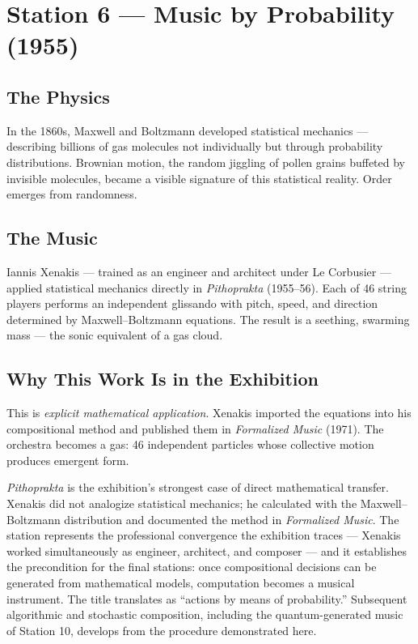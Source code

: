 \documentclass[11pt]{article}
\begin{document}
\section{Station 6 --- Music by Probability (1955)}

\subsection{The Physics}
In the 1860s, Maxwell and Boltzmann developed statistical mechanics --- describing billions
of gas molecules not individually but through probability distributions. Brownian motion, the
random jiggling of pollen grains buffeted by invisible molecules, became a visible signature
of this statistical reality. Order emerges from randomness.

\subsection{The Music}
Iannis Xenakis --- trained as an engineer and architect under Le Corbusier --- applied
statistical mechanics directly in \emph{Pithoprakta} (1955--56). Each of 46 string players
performs an independent glissando with pitch, speed, and direction determined by
Maxwell--Boltzmann equations. The result is a seething, swarming mass --- the sonic
equivalent of a gas cloud.

\subsection{Why This Work Is in the Exhibition}
This is \emph{explicit mathematical application}. Xenakis imported the equations into his
compositional method and published them in \emph{Formalized Music} (1971). The orchestra
becomes a gas: 46 independent particles whose collective motion produces emergent form.

\emph{Pithoprakta} is the exhibition's strongest case of direct mathematical transfer.
Xenakis did not analogize statistical mechanics; he calculated with the Maxwell--Boltzmann
distribution and documented the method in \emph{Formalized Music}. The station represents the
professional convergence the exhibition traces --- Xenakis worked simultaneously as engineer,
architect, and composer --- and it establishes the precondition for the final stations: once
compositional decisions can be generated from mathematical models, computation becomes a
musical instrument. The title translates as ``actions by means of probability.'' Subsequent
algorithmic and stochastic composition, including the quantum-generated music of Station 10,
develops from the procedure demonstrated here.
\end{document}
